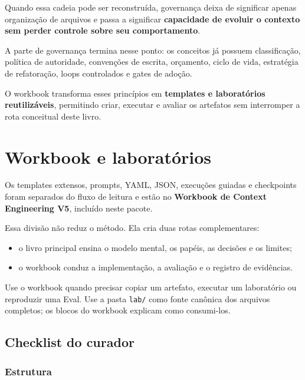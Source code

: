 \documentclass[
  10pt,
  a4paper,
  oneside]{book}
\providecommand{\tightlist}{%
  \setlength{\itemsep}{0pt}\setlength{\parskip}{0pt}}
\begin{document}
Quando essa cadeia pode ser reconstruída, governança deixa de significar
apenas organização de arquivos e passa a significar \textbf{capacidade
de evoluir o contexto sem perder controle sobre seu comportamento}.

A parte de governança termina nesse ponto: os conceitos já possuem
classificação, política de autoridade, convenções de escrita, orçamento,
ciclo de vida, estratégia de refatoração, loops controlados e gates de
adoção.

O workbook transforma esses princípios em \textbf{templates e
laboratórios reutilizáveis}, permitindo criar, executar e avaliar os
artefatos sem interromper a rota conceitual deste livro.

\newpage

\hypertarget{workbook-e-laboratuxf3rios}{%
\chapter{Workbook e laboratórios}\label{workbook-e-laboratuxf3rios}}

Os templates extensos, prompts, YAML, JSON, execuções guiadas e
checkpoints foram separados do fluxo de leitura e estão no
\textbf{Workbook de Context Engineering V5}, incluído neste pacote.

Essa divisão não reduz o método. Ela cria duas rotas complementares:

\begin{itemize}
\tightlist
\item
  o livro principal ensina o modelo mental, os papéis, as decisões e os
  limites;
\item
  o workbook conduz a implementação, a avaliação e o registro de
  evidências.
\end{itemize}

Use o workbook quando precisar copiar um artefato, executar um
laboratório ou reproduzir uma Eval. Use a pasta \texttt{lab/} como fonte
canônica dos arquivos completos; os blocos do workbook explicam como
consumi-los.

\hypertarget{checklist-do-curador}{%
\section{Checklist do curador}\label{checklist-do-curador}}

\small

\hypertarget{estrutura}{%
\subsection{Estrutura}\label{estrutura}}
\end{document}
